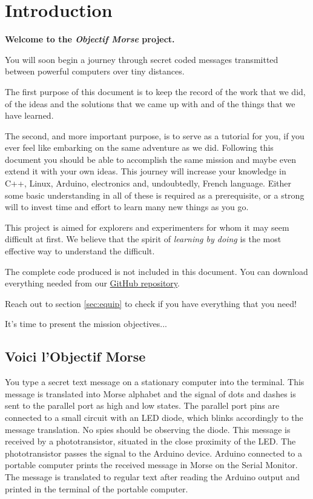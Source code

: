 \documentclass[12pt]{report}
\begin{document}
\newpage


\newpage

\chapter{Introduction} \label{chap:intro}

\textbf{Welcome to the \textit{Objectif Morse} project.}

You will soon begin a journey through secret coded messages transmitted between powerful computers over tiny distances.

The first purpose of this document is to keep the record of the work that we did, of the ideas and the solutions that we came up with and of the things that we have learned.

The second, and more important purpose, is to serve as a tutorial for you, if you ever feel like embarking on the same adventure as we did. Following this document you should be able to accomplish the same mission and maybe even extend it with your own ideas. This journey will increase your knowledge in C++, Linux, Arduino, electronics and, undoubtedly, French language. Either some basic understanding in all of these is required as a prerequisite, or a strong will to invest time and effort to learn many new things as you go.

This project is aimed for explorers and experimenters for whom it may seem difficult at first. We believe that the spirit of \textit{learning by doing} is the most effective way to understand the difficult.

The complete code produced is not included in this document. You can download everything needed from our \href{https://github.com/kamilazdybal/objectif-morse}{GitHub repository}.

Reach out to section \ref{sec:equip} to check if you have everything that you need!

It's time to present the mission objectives...

\section{Voici l'Objectif Morse}

You type a secret text message on a stationary computer into the terminal. This message is translated into Morse alphabet and the signal of dots and dashes is sent to the parallel port as high and low states. The parallel port pins are connected to a small circuit with an LED diode, which blinks accordingly to the message translation. No spies should be observing the diode. This message is received by a phototransistor, situated in the close proximity of the LED. The phototransistor passes the signal to the Arduino device. Arduino connected to a portable computer prints the received message in Morse on the Serial Monitor. The message is translated to regular text after reading the Arduino output and printed in the terminal of the portable computer. 
\end{document}
